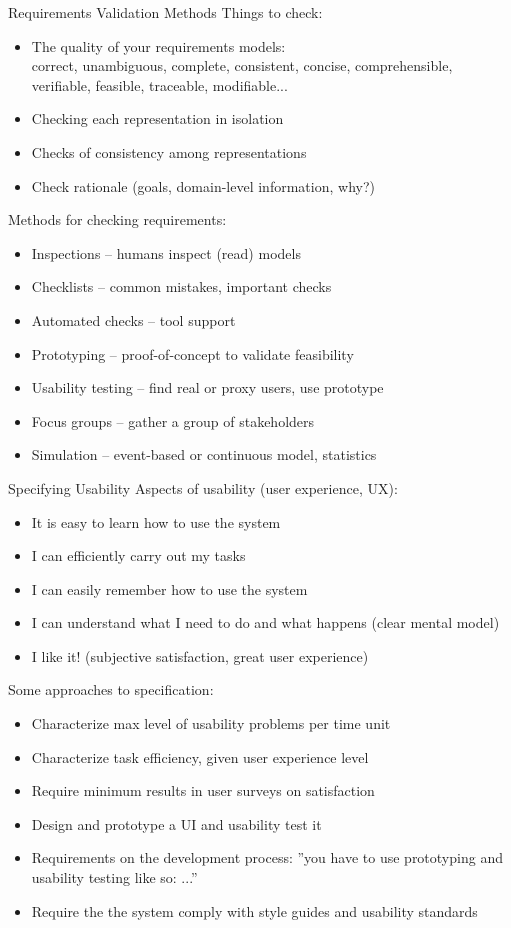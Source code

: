 \documentclass{simpleslides}
\begin{document}
\begin{frame}[fragile]{Requirements Validation Methods}
Things to check:
\begin{itemize}\small
\item The quality of your requirements models:\\correct, unambiguous, complete, consistent, concise, comprehensible, verifiable, feasible, traceable, modifiable...  
\item Checking each representation in isolation
\item Checks of consistency among representations
\item Check rationale (goals, domain-level information, why?)
\end{itemize}
  
Methods for checking requirements:
\begin{itemize}\small
\item Inspections -- humans inspect (read) models
\item Checklists  -- common mistakes, important checks
\item Automated checks -- tool support
\item Prototyping -- proof-of-concept to validate feasibility
\item Usability testing  -- find real or proxy users, use prototype
\item Focus groups  -- gather a group of stakeholders
\item Simulation -- event-based or continuous model, statistics
\end{itemize}
\end{frame}
  
\begin{frame}[fragile]{Specifying Usability}
Aspects of usability (user experience, UX):
\begin{itemize}
\item It is easy to learn how to use the system
\item I can efficiently carry out my tasks
\item I can easily remember how to use the system
\item I can understand what I need to do and what happens (clear mental model)
\item I like it! (subjective satisfaction, great user experience)
\end{itemize}
Some approaches to specification:
\begin{itemize}
\item Characterize max level of usability problems per time unit
\item Characterize task efficiency, given user experience level 
\item Require minimum results in user surveys on satisfaction 
\item Design and prototype a UI and usability test it
\item Requirements on the development process: ''you have to use prototyping and usability testing like so: ...''
\item Require the the system comply with style guides and usability standards
\end{itemize}

\end{frame}
\end{document}
